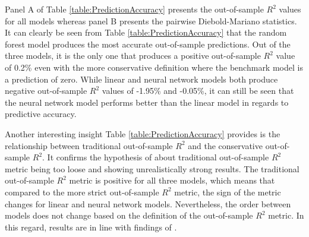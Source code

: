 \documentclass[12pt]{article}
\begin{document}
Panel A of Table \ref{table:PredictionAccuracy} presents the out-of-sample $R^2$ values for all models whereas panel B presents the pairwise Diebold-Mariano statistics. It can clearly be seen from Table \ref{table:PredictionAccuracy} that the random forest model produces the most accurate out-of-sample predictions. Out of the three models, it is the only one that produces a positive out-of-sample $R^2$ value of 0.2\% even with the more conservative definition where the benchmark model is a prediction of zero. While linear and neural network models both produce negative out-of-sample $R^2$ values of -1.95\% and -0.05\%, it can still be seen that the neural network model performs better than the linear model in regards to predictive accuracy. \par

Another interesting insight Table \ref{table:PredictionAccuracy} provides is the relationship between traditional out-of-sample $R^2$ and the conservative out-of-sample $R^2$. It confirms the hypothesis of \citet{guetal} about traditional out-of-sample $R^2$ metric being too loose and showing unrealistically strong results. The traditional out-of-sample $R^2$ metric is positive for all three models, which means that compared to the more strict out-of-sample $R^2$ metric, the sign of the metric changes for linear and neural network models. Nevertheless, the order between models does not change based on the definition of the out-of-sample $R^2$ metric. In this regard, results are in line with findings of \citet{Fieberg}. \par
\end{document}
